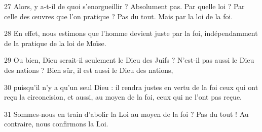 
27 Alors, y a-t-il de quoi s'enorgueillir ? Absolument pas. Par quelle loi ? Par celle des œuvres que l’on pratique ? Pas du tout. Mais par la loi de la foi.

28 En effet, nous estimons que l’homme devient juste par la foi, indépendamment de la pratique de la loi de Moïse.

29 Ou bien, Dieu serait-il seulement le Dieu des Juifs ? N’est-il pas aussi le Dieu des nations ? Bien sûr, il est aussi le Dieu des nations,

30 puisqu’il n’y a qu’un seul Dieu : il rendra justes en vertu de la foi ceux qui ont reçu la circoncision, et aussi, au moyen de la foi, ceux qui ne l’ont pas reçue.

31 Sommes-nous en train d’abolir la Loi au moyen de la foi ? Pas du tout ! Au contraire, nous confirmons la Loi.